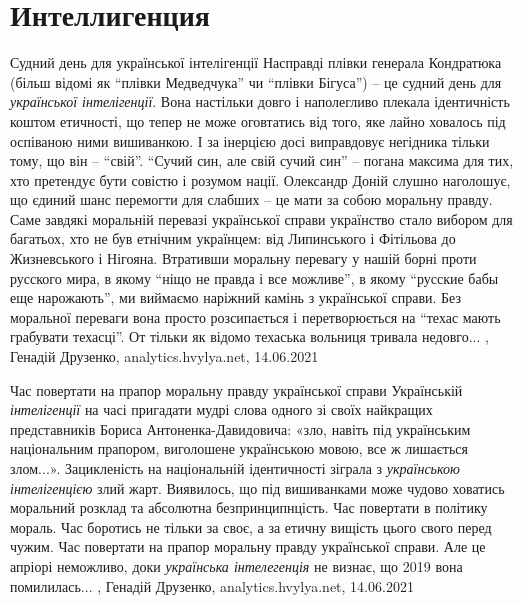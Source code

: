  
 
 
 
 
\chapter{Интеллигенция}
\label{sec:slova.intelligencia}

Судний день для української інтелігенції
Насправді плівки генерала Кондратюка (більш відомі як \enquote{плівки Медведчука} чи
\enquote{плівки Бігуса}) – це судний день для \emph{української інтелігенції}. Вона настільки
довго і наполегливо плекала ідентичність коштом етичності, що тепер не може
оговтатись від того, яке лайно ховалось під оспіваною ними вишиванкою. І за
інерцією досі виправдовує негідника тільки тому, що він – \enquote{свій}.  \enquote{Сучий син,
але свій сучий син} – погана максима для тих, хто претендує бути совістю і
розумом нації. Олександр Доній слушно наголошує, що єдиний шанс перемогти для
слабших – це мати за собою моральну правду. Саме завдякі моральній перевазі
української справи українство стало вибором для багатьох, хто не був етнічним
українцем: від Липинського і Фітільова до Жизневського і Нігояна.  Втративши
моральну перевагу у нашій борні проти русского мира, в якому \enquote{ніщо не правда і
все можливе}, в якому \enquote{русские бабы еще нарожають}, ми виймаємо наріжний камінь
з української справи. Без моральної переваги вона просто розсипається і
перетворюється на \enquote{техас мають грабувати техасці}. От тільки як відомо техаська
вольниця тривала недовго...
, Генадій Друзенко, 
analytics.hvylya.net, 14.06.2021

Час повертати на прапор моральну правду української справи
Українській \emph{інтелігенції} на часі пригадати мудрі слова одного зі своїх
найкращих представників Бориса Антоненка-Давидовича: «зло, навіть під
українським національним прапором, виголошене українською мовою, все ж
лишається злом...».  Зацикленість на національній ідентичності зіграла з
\emph{українською інтелігенцією} злий жарт. Виявилось, що під вишиванками може чудово
ховатись моральний розклад та абсолютна безпринципнцість. Час повертати в
політику мораль. Час боротись не тільки за своє, а за етичну вищість цього
свого перед чужим. Час повертати на прапор моральну правду української справи.
Але це апріорі неможливо, доки \emph{українська інтелегенція} не визнає, що 2019 вона
помилилась...
, Генадій Друзенко, 
analytics.hvylya.net, 14.06.2021

